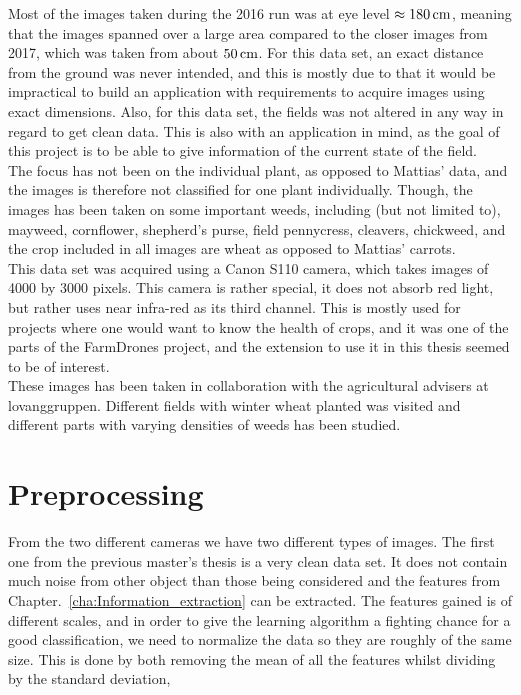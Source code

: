 Most of the images taken during the 2016 run was at eye level $\approx\unit[180]{cm}$, meaning that the images spanned over a large area compared to the closer images from 2017, which was taken from about $\unit[50]{cm}$. For this data set, an exact distance from the ground was never intended, and this is mostly due to that it would be impractical to build an application with requirements to acquire images using exact dimensions. Also, for this data set, the fields was not altered in any way in regard to get clean data. This is also with an application in mind, as the goal of this project is to be able to give information of the current state of the field. \\

The focus has not been on the individual plant, as opposed to Mattias' data, and the images is therefore not classified for one plant individually. Though, the images has been taken on some important weeds, including (but not limited to), mayweed, cornflower, shepherd's purse, field pennycress, cleavers, chickweed, and the crop included in all images are wheat as opposed to Mattias' carrots.\\

This data set was acquired using a Canon S110 camera, which takes images of 4000 by 3000 pixels. This camera is rather special, it does not absorb red light, but rather uses near infra-red as its third channel. This is mostly used for projects where one would want to know the health of crops, and it was one of the parts of the FarmDrones project, and the extension to use it in this thesis seemed to be of interest.\\

These images has been taken in collaboration with the agricultural advisers at lovanggruppen. Different fields with winter wheat planted was visited and different parts with varying densities of weeds has been studied.

\section{Preprocessing}

From the two different cameras we have two different types of images. The first one from the previous master's thesis is a very clean data set. It does not contain much noise from other object than those being considered and the features from Chapter.~\ref{cha:Information_extraction} can be extracted. The features gained is of different scales, and in order to give the learning algorithm a fighting chance for a good classification, we need to normalize the data so they are roughly of the same size. This is done by both removing the mean of all the features whilst dividing by the standard deviation,

